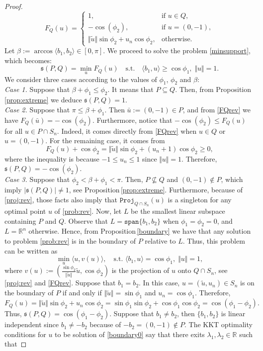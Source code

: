 \documentclass[hidelinks,onefignum,onetabnum]{siamart250211}
\theoremstyle{definition}
\theoremstyle{remark}
\newcommand{\R}{\mathbb R}
\newcommand{\tu}{\tilde{u}}
\newcommand{\bu}{\bar{u}}
\newcommand{\proj}{\mathtt{Proj}}
\begin{document}
\begin{proof}
\begin{equation}\label{FQrev}
F_Q(u)=\begin{cases}
1,&\text{if }u\in Q,\\
-\cos(\phi_2),&\text{if }u=(0,-1),\\
\Vert\tu\Vert\sin\phi_2 + u_n\cos\phi_2,&\text{otherwise}.
\end{cases}
\end{equation}
Let $\beta:=\arccos\langle b_1,b_2\rangle\in[0,\pi].$ We proceed to solve the problem \eqref{minsupport}, which becomes: 
\begin{equation}\label{prob:rev}
\mathfrak{s}(P,Q)=\min_u F_Q(u)\quad
\text{s.t.}\quad\langle b_1, u\rangle\geq\cos \phi_1,\;\Vert u\Vert=1.
\end{equation}
We consider three cases according to the values of $\phi_1$, $\phi_2$ and $\beta$:\\
\emph{Case 1.} Suppose that $\beta+\phi_1\leq\phi_2$. It means that $P\subseteq Q$. Then, from Proposition\,\ref{prop:extreme} we deduce $\mathfrak{s}(P,Q)=1$.\\
\emph{Case 2.} Suppose that $\pi\leq\beta+\phi_1$. Then $\bu:=(0,-1)\in P$, and from \eqref{FQrev} we have $F_Q(\bu)= -\cos(\phi_2)$. Furthermore, notice that $-\cos(\phi_2)\leq F_Q(u)$ for all $u\in P\cap S_n$. Indeed, it comes directly from \eqref{FQrev} when $u\in Q$ or $u=(0,-1)$. For the remaining case, it comes from
\[F_Q(u)+\cos\phi_2=\Vert\tu\Vert\sin\phi_2 + (u_n+1)\cos\phi_2\geq 0,\]
where the inequality is because $-1\leq u_n\leq 1$ since $\Vert u\Vert=1$. Therefore, $\mathfrak{s}(P,Q)=-\cos(\phi_2)$.\\
\emph{Case 3.} Suppose that $\phi_2<\beta+\phi_1<\pi$. Then, $P\not\subseteq Q$ and $(0,-1)\notin P$, which imply $|\mathfrak{s}(P,Q)|\neq 1$, see Proposition\,\ref{prop:extreme}. Furthermore, because of \eqref{proj:rev}, those facts also imply that $\proj_{Q\cap S_n}(u)$ is a singleton for any optimal point $u$ of \eqref{prob:rev}. Now, let $L$ be the smallest linear subspace containing $P$ and $Q$. Observe that $L=\mathtt{span}\{b_1,b_2\}$ when $\phi_1=\phi_2=0$, and $L=\R^n$ otherwise. Hence, from Proposition\,\ref{boundary} we have that any solution to problem \eqref{prob:rev} is in the boundary of $P$ relative to $L$. Thus, this problem can be written as
\begin{equation}\label{boundary0}
\min_{u} \langle u, v(u)\rangle,\quad\text{s.t. }\langle b_1, u\rangle=\cos \phi_1,\;\Vert u\Vert=1,
\end{equation}
where $v(u):=\left(\frac{\sin\phi_2}{\Vert\tu\Vert}\tu,\cos\phi_2\right)$ is the projection of $u$ onto $Q\cap S_n$, see \eqref{proj:rev} and \eqref{FQrev}.  Suppose that $b_1=b_2$. In this case, $u=(\tu,u_n)\in S_n$ is on the boundary of $P$ if and only if $\Vert\tu\Vert=\sin\phi_1$ and $u_n=\cos\phi_1$. Therefore, \[F_Q(u)=\Vert\tu\Vert\sin\phi_2 + u_n\cos\phi_2=\sin\phi_1\sin\phi_2+\cos\phi_1\cos\phi_2=\cos(\phi_1-\phi_2).\] Thus, $\mathfrak{s}(P,Q)=\cos(\phi_1-\phi_2)$. Suppose that $b_1\neq b_2$, then $\{b_1,b_2\}$ is linear independent since $b_1\neq-b_2$ because of $-b_2=(0,-1)\notin P$. The KKT optimality conditions for $u$ to be solution of \eqref{boundary0} say that there exits $\lambda_1,\lambda_2\in\R$ such that 

\end{proof}
\end{document}
